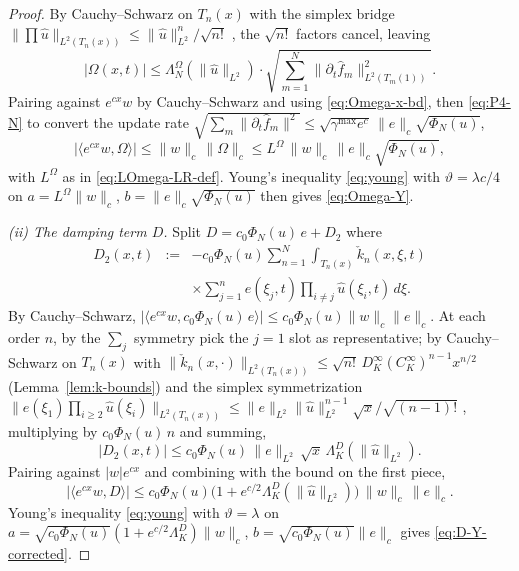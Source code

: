 \documentclass[journal,twoside,web]{ieeecolor}
\begin{document}
\begin{proof}
By Cauchy--Schwarz on $T_n(x)$ with the simplex bridge $\|\prod\hat u\|_{L^2(T_n(x))}\le\|\hat u\|^n_{L^2}/\sqrt{n!}$ \cite{HV2}, the $\sqrt{n!}$ factors cancel, leaving
\begin{equation}\label{eq:Omega-x-bd}
|\Omega(x,t)|\le\Lambda^\Omega_N(\|\hat u\|_{L^2})\cdot\sqrt{\sum_{m=1}^N\|\partial_t\hat f_m\|^2_{L^2(T_m(1))}}.
\end{equation}
Pairing against $e^{cx}w$ by Cauchy--Schwarz and using \eqref{eq:Omega-x-bd}, then \eqref{eq:P4-N} to convert the update rate $\sqrt{\sum_m\|\partial_t\hat f_m\|^2}\le\sqrt{\gamma^{\max}e^c}\,\|e\|_c\sqrt{\Phi_N(u)}$,
\begin{equation}\label{eq:Omega-pre-Young}
|\langle e^{cx}w,\Omega\rangle|\le\|w\|_c\,\|\Omega\|_c\le L^\Omega\,\|w\|_c\,\|e\|_c\sqrt{\Phi_N(u)},
\end{equation}
with $L^\Omega$ as in \eqref{eq:LOmega-LR-def}. Young's inequality \eqref{eq:young} with $\vartheta=\lambda c/4$ on $a=L^\Omega\|w\|_c$, $b=\|e\|_c\sqrt{\Phi_N(u)}$ then gives \eqref{eq:Omega-Y}.

\emph{(ii) The damping term $D$.} Split $D=c_0\Phi_N(u)\,e+D_2$ where
\begin{eqnarray}
D_2(x,t) &:=& -c_0\Phi_N(u)\sum_{n=1}^N\int_{T_n(x)}\check k_n(x,\xi,t) \nonumber\\
&& \times\sum_{j=1}^n e(\xi_j,t)\!\prod_{i\ne j}\!\hat u(\xi_i,t)\,d\xi. \label{eq:D2-def}
\end{eqnarray}
By Cauchy--Schwarz, $|\langle e^{cx}w,c_0\Phi_N(u)\,e\rangle|\le c_0\Phi_N(u)\|w\|_c\|e\|_c$. At each order $n$, by the $\sum_j$ symmetry pick the $j=1$ slot as representative; by Cauchy--Schwarz on $T_n(x)$ with $\|\check k_n(x,\cdot)\|_{L^2(T_n(x))}\le\sqrt{n!}\,D_K^\infty(C_K^\infty)^{n-1}x^{n/2}$ (Lemma~\ref{lem:k-bounds}) and the simplex symmetrization $\|e(\xi_1)\prod_{i\ge 2}\hat u(\xi_i)\|_{L^2(T_n(x))}\le\|e\|_{L^2}\|\hat u\|^{n-1}_{L^2}\sqrt{x}/\sqrt{(n-1)!}$ \cite[eq.~(27)]{HV2}, multiplying by $c_0\Phi_N(u)\,n$ and summing,
\begin{equation}\label{eq:D2-bd}
|D_2(x,t)|\le c_0\Phi_N(u)\,\|e\|_{L^2}\,\sqrt{x}\,\Lambda^D_K(\|\hat u\|_{L^2}).
\end{equation}
Pairing against $|w|e^{cx}$ and combining with the bound on the first piece,
\begin{equation}\label{eq:D-bd}
|\langle e^{cx}w,D\rangle|\le c_0\Phi_N(u)\bigl(1+e^{c/2}\Lambda^D_K(\|\hat u\|_{L^2})\bigr)\,\|w\|_c\,\|e\|_c.
\end{equation}
Young's inequality \eqref{eq:young} with $\vartheta=\lambda$ on $a=\sqrt{c_0\Phi_N(u)}(1+e^{c/2}\Lambda^D_K)\|w\|_c$, $b=\sqrt{c_0\Phi_N(u)}\|e\|_c$ gives \eqref{eq:D-Y-corrected}.


\end{proof}
\end{document}
